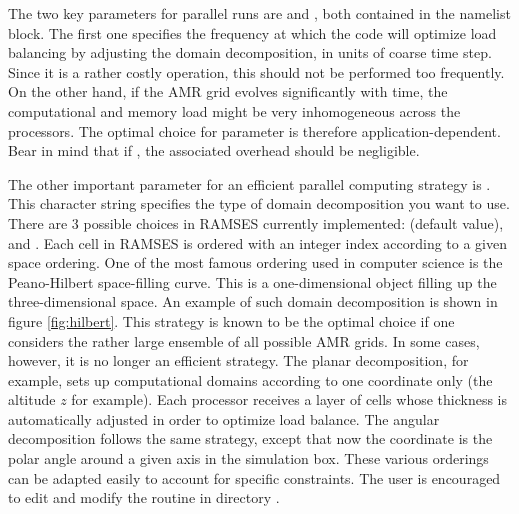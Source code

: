 The two key parameters for parallel runs are  and
, both contained in the 
namelist block. The first one specifies the frequency at which the code
will optimize load balancing by adjusting the domain decomposition, in
units of coarse time step. Since it is a rather costly operation, this
should not be performed too frequently. On the other hand, if the AMR
grid evolves significantly with time, the computational and memory load
might be very inhomogeneous across the processors. The optimal choice
for parameter  is therefore application-dependent. Bear
in mind that if , the associated overhead should be
negligible. 

The other important parameter for an efficient parallel computing
strategy is . This character string specifies the type
of domain decomposition you want to use. There are 3 possible choices in
RAMSES currently implemented:  (default value),
 and . Each cell in RAMSES is ordered with
an integer index according to a given space ordering. One of the most
famous ordering used in computer science is the Peano-Hilbert
space-filling curve. This is a one-dimensional object filling up the
three-dimensional space. An example of such domain decomposition is
shown in figure \ref{fig:hilbert}. This strategy is known to be the
optimal choice if one considers the rather large ensemble of all
possible AMR grids. In some cases, however, it is no longer an
efficient strategy. The planar decomposition, for example, sets up
computational domains according to one coordinate only (the altitude $z$
for example). Each processor receives a layer of cells whose thickness
is automatically adjusted in order to optimize load balance. The angular
decomposition follows the same strategy, except that now the coordinate
is the polar angle around a given axis in the simulation box. These
various orderings can be adapted easily to account for specific
constraints. The user is encouraged to edit and modify the routine
 in directory .

